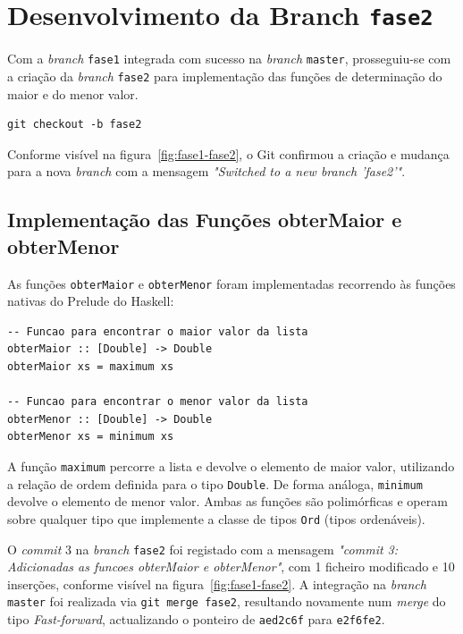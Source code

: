 \documentclass[12pt, a4paper, oneside]{report}
\begin{document}
\section{Desenvolvimento da Branch \texttt{fase2}}

Com a \textit{branch} \texttt{fase1} integrada com sucesso na \textit{branch} \texttt{master}, prosseguiu-se com a criação da \textit{branch} \texttt{fase2} para implementação das funções de determinação do maior e do menor valor.

\begin{lstlisting}[style=bash, caption={Criação da branch fase2}, label=lst:checkout-fase2]
git checkout -b fase2
\end{lstlisting}

Conforme visível na figura~\ref{fig:fase1-fase2}, o Git confirmou a criação e mudança para a nova \textit{branch} com a mensagem \textit{"Switched to a new branch 'fase2'"}.

\subsection{Implementação das Funções obterMaior e obterMenor}

As funções \texttt{obterMaior} e \texttt{obterMenor} foram implementadas recorrendo às funções nativas do Prelude do Haskell:

\begin{lstlisting}[style=haskell, caption={Funções obterMaior e obterMenor -- branch fase2}, label=lst:fase2]
-- Funcao para encontrar o maior valor da lista
obterMaior :: [Double] -> Double
obterMaior xs = maximum xs

-- Funcao para encontrar o menor valor da lista
obterMenor :: [Double] -> Double
obterMenor xs = minimum xs
\end{lstlisting}

A função \texttt{maximum} percorre a lista e devolve o elemento de maior valor, utilizando a relação de ordem definida para o tipo \texttt{Double}. De forma análoga, \texttt{minimum} devolve o elemento de menor valor. Ambas as funções são polimórficas e operam sobre qualquer tipo que implemente a classe de tipos \texttt{Ord} (tipos ordenáveis).

O \textit{commit} 3 na \textit{branch} \texttt{fase2} foi registado com a mensagem \textit{"commit 3: Adicionadas as funcoes obterMaior e obterMenor"}, com 1 ficheiro modificado e 10 inserções, conforme visível na figura~\ref{fig:fase1-fase2}. A integração na \textit{branch} \texttt{master} foi realizada via \texttt{git merge fase2}, resultando novamente num \textit{merge} do tipo \textit{Fast-forward}, actualizando o ponteiro de \texttt{aed2c6f} para \texttt{e2f6fe2}.
\end{document}
